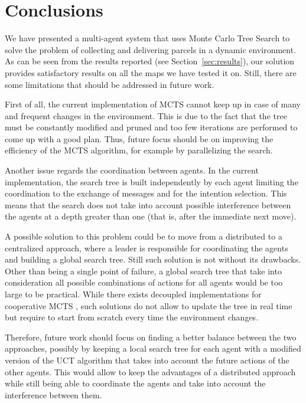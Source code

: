 \section{Conclusions}

We have presented a multi-agent system that uses Monte Carlo Tree Search to solve the problem of collecting and delivering parcels in a dynamic environment.
As can be seen from the results reported (see Section~\ref{sec:results}), our solution provides satisfactory results on all the maps we have tested it on. Still, there are some limitations that should be addressed in future work.

First of all, the current implementation of MCTS cannot keep up in case of many and frequent changes in the environment. This is due to the fact that the tree must be constantly modified and pruned and too few iterations are performed to come up with a good plan. Thus, future focus should be on improving the efficiency of the MCTS algorithm, for example by parallelizing the search.

Another issue regards the coordination between agents. In the current implementation, the search tree is built independently by each agent limiting the coordination to the exchange of messages and for the intention selection. This means that the search does not take into account possible interference between the agents at a depth greater than one (that is, after the immediate next move).

A possible solution to this problem could be to move from a distributed to a centralized approach, where a leader is responsible for coordinating the agents and building a global search tree. Still such solution is not without its drawbacks. Other than being a single point of failure, a global search tree that take into consideration all possible combinations of actions for all agents would be too large to be practical. While there exists decoupled implementations for cooperative MCTS \parencite{asik2023decoupled}, such solutions do not allow to update the tree in real time but require to start from scratch every time the environment changes.

Therefore, future work should focus on finding a better balance between the two approaches, possibly by keeping a local search tree for each agent with a modified version of the UCT algorithm that takes into account the future actions of the other agents. This would allow to keep the advantages of a distributed approach while still being able to coordinate the agents and take into account the interference between them.
